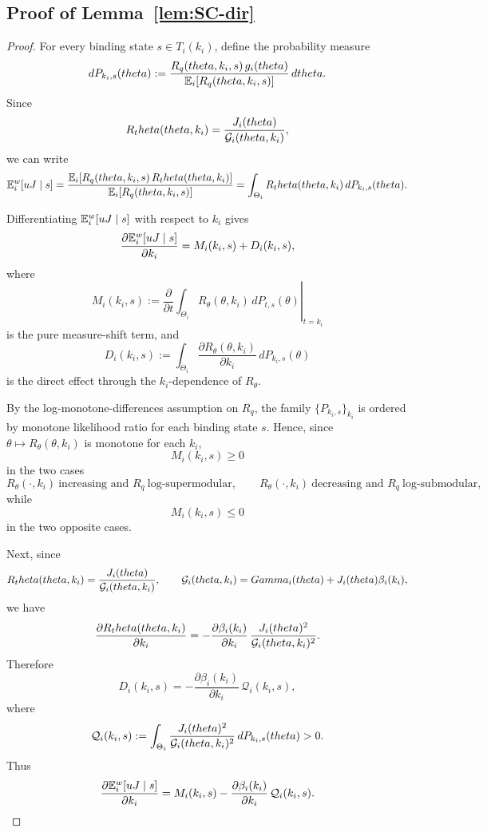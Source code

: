 \documentclass[master.tex]{subfiles}
\begin{document}

\subsection{Proof of Lemma~\ref{lem:SC-dir}}
\begin{proof}
For every binding state $s\in T_i(k_i)$, define the probability measure
\[
dP_{k_i,s}(theta):=
\frac{R_q(theta,k_i,s)\,g_i(theta)}
{\mathbb{E}_i[R_q(theta,k_i,s)]}\,dtheta.
\]
Since
\[
R_theta(theta,k_i)=\frac{J_i(theta)}{\mathcal{G}_i(theta,k_i)},
\]
we can write
\[
\mathsf {\mathbb{E}}_i^w[uJ\mid s]
=
\frac{\mathbb{E}_i\!\left[R_q(theta,k_i,s)\,R_theta(theta,k_i)\right]}
{\mathbb{E}_i\!\left[R_q(theta,k_i,s)\right]}
=
\int_{\Theta_i} R_theta(theta,k_i)\,dP_{k_i,s}(theta).
\]

Differentiating $\mathsf {\mathbb{E}}_i^w[uJ\mid s]$ with respect to $k_i$ gives
\[
\frac{\partial \mathsf {\mathbb{E}}_i^w[uJ\mid s]}{\partial k_i}
=
M_i(k_i,s)+D_i(k_i,s),
\]
where
\[
M_i(k_i,s)
:=
\left.
\frac{\partial}{\partial t}
\int_{\Theta_i}R_\theta(\theta,k_i)\,dP_{t,s}(\theta)
\right|_{t=k_i}
\]
is the pure measure-shift term, and
\[
D_i(k_i,s)
:=
\int_{\Theta_i}
\frac{\partial R_\theta(\theta,k_i)}{\partial k_i}\,dP_{k_i,s}(\theta)
\]
is the direct effect through the $k_i$-dependence of $R_\theta$.

By the log-monotone-differences assumption on $R_q$, the family $\{P_{k_i,s}\}_{k_i}$ is ordered by monotone likelihood ratio for each binding state $s$. Hence, since $\theta\mapsto R_\theta(\theta,k_i)$ is monotone for each $k_i$,
\[
M_i(k_i,s)\ge 0
\]
in the two cases
\[
R_\theta(\cdot,k_i)\ \text{increasing and }R_q\ \text{log-supermodular},
\qquad
R_\theta(\cdot,k_i)\ \text{decreasing and }R_q\ \text{log-submodular},
\]
while
\[
M_i(k_i,s)\le 0
\]
in the two opposite cases.

Next, since
\[
R_theta(theta,k_i)=\frac{J_i(theta)}{\mathcal{G}_i(theta,k_i)},
\qquad
\mathcal{G}_i(theta,k_i)=Gamma_i(theta)+J_i(theta)\beta_i(k_i),
\]
we have
\[
\frac{\partial R_theta(theta,k_i)}{\partial k_i}
=
-\frac{\partial \beta_i(k_i)}{\partial k_i}\,
\frac{J_i(theta)^2}{\mathcal{G}_i(theta,k_i)^2}.
\]
Therefore
\[
D_i(k_i,s)
=
-\frac{\partial \beta_i(k_i)}{\partial k_i}\,\mathcal Q_i(k_i,s),
\]
where
\[
\mathcal Q_i(k_i,s)
:=
\int_{\Theta_i}
\frac{J_i(theta)^2}{\mathcal{G}_i(theta,k_i)^2}\,dP_{k_i,s}(theta)
>0.
\]
Thus
\[
\frac{\partial \mathsf {\mathbb{E}}_i^w[uJ\mid s]}{\partial k_i}
=
M_i(k_i,s)-\frac{\partial \beta_i(k_i)}{\partial k_i}\,\mathcal Q_i(k_i,s).
\]


\end{proof}
\end{document}
